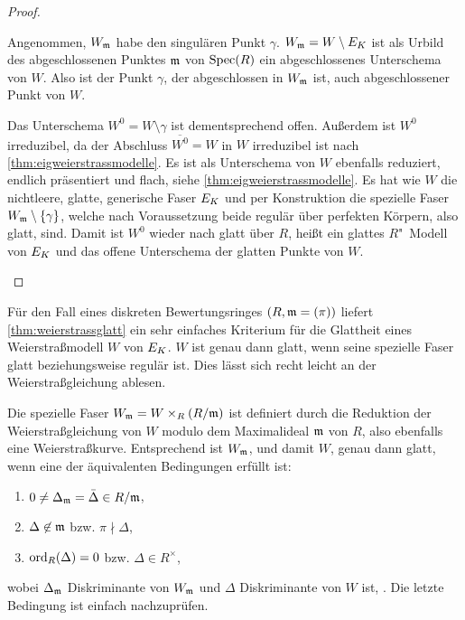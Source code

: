 \begin{Satz}
\begin{proof}
\begin{enumerate}[resume*,start=1]
      Angenommen, $W_{\mathfrak{m}}$ habe den singulären Punkt $\gamma$.
      $W_{\mathfrak{m}}=W\setminus E_{K}$ ist als Urbild des abgeschlossenen Punktes
      $\mathfrak{m}$ von $\operatorname{Spec}(R)$ ein abgeschlossenes Unterschema von $W$.
      Also ist der Punkt $\gamma$, der abgeschlossen in $W_{\mathfrak{m}}$ ist, auch
      abgeschlossener Punkt von $W$.
      
      Das Unterschema $W^0=W\setminus\gamma$ ist dementsprechend offen.
      Außerdem ist $W^0$ irreduzibel, da der Abschluss
      $\overline{W^0}=W$ in $W$ irreduzibel ist nach
      \ref{thm:eigweierstrassmodelle}.
      Es ist als Unterschema von $W$ ebenfalls reduziert, endlich
      präsentiert und flach, siehe \ref{thm:eigweierstrassmodelle}.
      Es hat wie $W$ die nichtleere, glatte, generische Faser $E_{K}$ und
      per Konstruktion die spezielle Faser ${W_{\mathfrak{m}}\setminus\{\gamma\}}$,
      welche nach Voraussetzung beide regulär über perfekten Körpern,
      also glatt, sind.
      Damit ist $W^0$ wieder nach \cite[Proposition~8.5/17]{bosch}
      glatt über $R$, heißt ein glattes $R$"~Modell von $E_{K}$ und das
      offene Unterschema der glatten Punkte von $W$.
      \qedhere
    \end{enumerate}
  \end{proof}
\end{Satz}

\begin{Bemerkung}\label{thm:weierstraßmodellglatt}
  Für den Fall eines diskreten Bewertungsringes $(R,\mathfrak{m}=(\pi))$ liefert
  \ref{thm:weierstrassglatt} ein sehr einfaches Kriterium für die
  Glattheit eines Weierstraßmodell $W$ von $E_{K}$.
  $W$ ist genau dann glatt, wenn seine spezielle Faser glatt
  beziehungsweise regulär ist.
  Dies lässt sich recht leicht an der Weierstraßgleichung ablesen.
  
  Die spezielle Faser $W_{\mathfrak{m}}=W\times_R (R/\mathfrak{m})$ ist definiert
  durch die Reduktion der Weierstraßgleichung von $W$ modulo dem
  Maximalideal $\mathfrak{m}$ von $R$, also ebenfalls eine Weierstraßkurve.
  Entsprechend ist $W_{\mathfrak{m}}$, und damit $W$, genau dann glatt, wenn
  eine der äquivalenten Bedingungen erfüllt ist:
  \begin{enumerate}[label=(\roman*)]
  \item $0\neq\Delta_{\mathfrak{m}}=\bar\Delta\in R/\mathfrak{m}$,
  \item $\Delta\not\in\mathfrak{m}$ bzw. $\pi\nmid\Delta$,
  \item $\operatorname{ord}_R(\Delta)=0$ bzw. $\Delta\in R^\times$,
  \end{enumerate}
  wobei $\Delta_{\mathfrak{m}}$ Diskriminante von $W_{\mathfrak{m}}$ und $\Delta$
  Diskriminante von $W$ ist,
  \cite[vgl.][Proposition~VII.5.1~(a)]{silverman}.
  Die letzte Bedingung ist einfach nachzuprüfen.
\end{Bemerkung}

